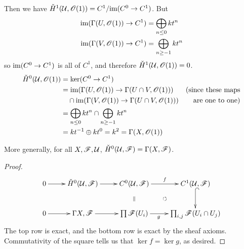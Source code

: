 
Then we have $\check H^1(\mathcal{U},\mathscr{O}(1)) = C^1/\text{im}(C^0\to C^1)$.  But
\begin{align*}
\text{im} (\Gamma(U,\mathscr{O}(1))\to C^1) &= \bigoplus_{n\le 0} kt^n\\
\text{im} (\Gamma(V,\mathscr{O}(1))\to C^1) &= \bigoplus_{n\ge -1} kt^n\\
\end{align*}
so $\text{im}(C^0\to C^1)$ is all of $C^1$, and therefore $\check
H^1(\mathcal{U},\mathscr{O}(1))=0$.
\begin{align*}
\check H^0(\mathcal{U},\mathscr{O}(1)) &= \ker(C^0\to C^1) \\
    &=\text{im}(\Gamma(U,\mathscr{O}(1))\to \Gamma(U\cap V,\mathscr{O}(1)))& \text{(since these maps}\\ &\quad \cap \text{im}(\Gamma(V,\mathscr{O}(1))\to \Gamma(U\cap
    V,\mathscr{O}(1))) &\text{are one to one)}\\
    &= \bigoplus_{n\le 0} kt^n \cap \bigoplus_{n\ge -1} kt^n\\
    &= kt^{-1}\oplus kt^0 = k^2 = \Gamma(X,\mathscr{O}(1))
\end{align*}

More generally, for all $X,\mathscr{F},\mathcal{U}$, $\check H^0(\mathcal{U},\mathscr{F}) =
\Gamma(X,\mathscr{F})$.
\begin{proof}
\[\xymatrix{
 0\ar[r] &\check H^0(\U,\F) \ar[r] & C^0(\U,\F) \ar[r]^f \ar@{}[d]|{\parallel} &
 C^1(\U,\F) \ar@{^(->}[d] \\
 0 \ar[r] & \Gamma{X,\F} \ar[r]  & \prod \F(U_i) \ar[r]_(.4)g \ar@{}[ru]|{\circlearrowleft} &
 \prod_{i,j}\F(U_i\cap U_j)
}\] The top row is exact, and the bottom row is exact by the sheaf
axioms.  Commutativity of the square tells us that $\ker f = \ker
g$, as desired.
\end{proof}
